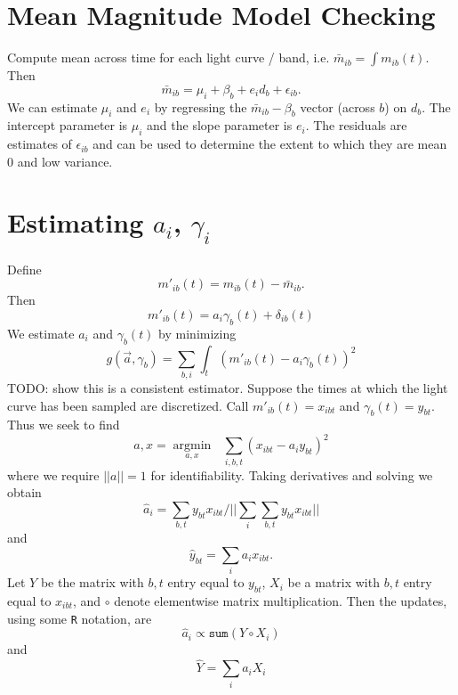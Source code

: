 \documentclass[12pt]{article}
\newcommand{\argmin}[1]{\underset{#1}{\operatorname{argmin}}\text{ }}
\newcommand{\todo}[1]{{\color{red}TODO: #1}}
\begin{document}
\section{Mean Magnitude Model Checking}

Compute mean across time for each light curve / band, i.e. $\bar{m}_{ib} = \int m_{ib}(t)$. Then
\begin{equation*}
  \bar{m}_{ib} = \mu_i + \beta_b + e_id_b + \epsilon_{ib}.
\end{equation*}
We can estimate $\mu_i$ and $e_i$ by regressing the $\bar{m}_{ib} - \beta_b$ vector (across $b$) on $d_b$. The intercept parameter is $\mu_i$ and the slope parameter is $e_i$. The residuals are estimates of $\epsilon_{ib}$ and can be used to determine the extent to which they are mean $0$ and low variance.


\section{Estimating $a_i$, $\gamma_i$}

Define
\begin{equation*}
m'_{ib}(t) = m_{ib}(t) - \bar{m}_{ib}.
\end{equation*}
Then
\begin{equation*}
  m'_{ib}(t) = a_i\gamma_b(t) + \delta_{ib}(t)
\end{equation*}
We estimate $a_i$ and $\gamma_b(t)$ by minimizing
\begin{equation*}
  g(\vec{a},\gamma_b) = \sum_{b,i} \int_t (m'_{ib}(t) - a_i \gamma_b(t))^2
\end{equation*}
\todo{show this is a consistent estimator.}
Suppose the times at which the light curve has been sampled are discretized. Call $m'_{ib}(t) = x_{ibt}$ and $\gamma_{b}(t) = y_{bt}$. Thus we seek to find
\begin{equation*}
  a,x = \argmin{a,x} \sum_{i,b,t} (x_{ibt} - a_i y_{bt})^2
\end{equation*}
where we require $||a||=1$ for identifiability. Taking derivatives and solving we obtain
\begin{equation*}
  \widehat{a}_i = \sum_{b,t} y_{bt}x_{ibt} / ||\sum_i \sum_{b,t} y_{bt}x_{ibt}||
\end{equation*}
and
\begin{equation*}
  \widehat{y}_{bt} = \sum_i a_ix_{ibt}.
\end{equation*}
Let $Y$ be the matrix with $b,t$ entry equal to $y_{bt}$, $X_i$ be a matrix with $b,t$ entry equal to $x_{ibt}$, and $\circ$ denote elementwise matrix multiplication. Then the updates, using some \texttt{R} notation, are
\begin{equation*}
  \widehat{a}_i \propto \texttt{sum}(Y\circ X_i)
\end{equation*}
and
\begin{equation*}
  \widehat{Y} = \sum_i a_iX_i
\end{equation*}



%
%
\end{document}
